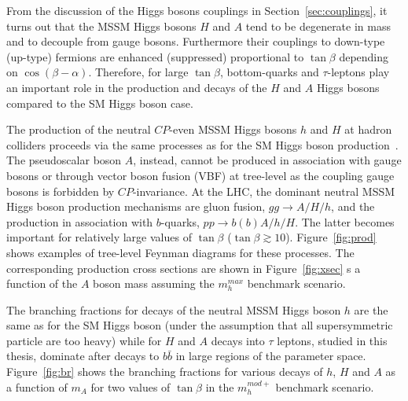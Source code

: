 From the discussion of the Higgs bosons couplings  in Section~\ref{sec:couplings}, it  turns out that the MSSM Higgs bosons $H$ and $A$
tend to be degenerate in mass and to decouple from gauge bosons. Furthermore their couplings to
down-type (up-type) fermions are enhanced (suppressed) proportional to $\tan\beta$ depending on
$\cos(\beta - \alpha)$. Therefore, for large $\tan\beta$, bottom-quarks and $\tau$-leptons 
play an important role in the production and decays of the $H$ and $A$ Higgs bosons compared to 
the SM Higgs boson case.

The production of the neutral $CP$-even MSSM Higgs bosons $h$ and $H$ at hadron
colliders proceeds via the same processes as for the SM Higgs
boson production~\cite{LHCxsec1}. The pseudoscalar boson $A$, instead, cannot be produced
in association with gauge bosons or through  vector boson fusion (VBF) at
tree-level as the coupling gauge bosons is forbidden by $CP$-invariance.  At
the LHC,  the dominant  neutral MSSM Higgs boson production mechanisms 
are gluon fusion, $gg\rightarrow A/H/h$, and the production in association with $b$-quarks, $pp \rightarrow b(b)A/h/H$.
The latter becomes important for relatively large values of $\tan\beta$ ($\tan\beta \apprge 10$). 
Figure~\ref{fig:prod} shows examples of tree-level  Feynman diagrams for these processes. 
The corresponding production cross sections are shown in Figure~\ref{fig:xsec}  s a function of the 
$A$ boson mass assuming the $m_h^{max}$ benchmark scenario.


The branching fractions for decays of the neutral
MSSM Higgs boson $h$ are the same as for the SM Higgs boson (under the assumption that all supersymmetric particle
are too heavy) while for $H$ and $A$  decays into $\tau$ leptons, studied in this thesis, 
dominate after decays to $b\bar{b}$ in large regions of the parameter space.
Figure~\ref{fig:br} shows the  branching fractions for various decays of $h$, $H$ and $A$ 
as a  function of $m_A$ for two values of $\tan \beta$ in the  $m_h^{mod+}$ benchmark scenario.




